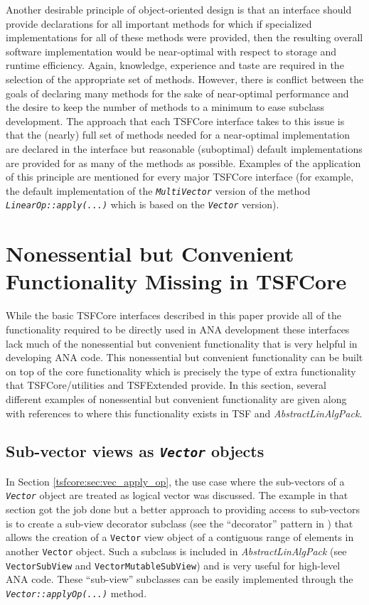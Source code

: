 Another desirable principle of object-oriented design is that an
interface should provide declarations for all important methods for
which if specialized implementations for all of these methods were
provided, then the resulting overall software implementation would be
near-optimal with respect to storage and runtime efficiency.  Again,
knowledge, experience and taste are required in the selection of the
appropriate set of methods.  However, there is conflict between the
goals of declaring many methods for the sake of near-optimal
performance and the desire to keep the number of methods to a minimum
to ease subclass development.  The approach that each TSFCore
interface takes to this issue is that the (nearly) full set of methods
needed for a near-optimal implementation are declared in the interface
but reasonable (suboptimal) default implementations are provided for
as many of the methods as possible.  Examples of the application of
this principle are mentioned for every major TSFCore interface (for
example, the default implementation of the
{}\texttt{\textit{Multi\-Vector}} version of the method
{}\texttt{\textit{LinearOp\-::apply(\-...)}} which is based on the
{}\texttt{\textit{Vector}} version).

%
\section{Nonessential but Convenient Functionality Missing in TSFCore}
\label{tsfcore:sec:convenience_functionality}
%

While the basic TSFCore interfaces described in this paper provide all
of the functionality required to be directly used in ANA development
these interfaces lack much of the nonessential but convenient
functionality that is very helpful in developing ANA code.  This
nonessential but convenient functionality can be built on top of the
core functionality which is precisely the type of extra functionality
that TSFCore/utilities and TSFExtended provide.  In this section,
several different examples of nonessential but convenient
functionality are given along with references to where this
functionality exists in TSF and {}\textit{AbstractLinAlgPack}.

%
\subsection{Sub-vector views as {}\texttt{\textit{Vector}} objects}
%

In Section {}\ref{tsfcore:sec:vec_apply_op}, the use case where the
sub-vectors of a {}\texttt{\textit{Vector}} object are treated as
logical vector was discussed.  The example in that section got the job
done but a better approach to providing access to sub-vectors is to
create a sub-view decorator subclass (see the ``decorator'' pattern in
{}\cite{ref:gama_et_al_1995}) that allows the creation of a
{}\texttt{Vector} view object of a contiguous range of elements in
another {}\texttt{Vector} object.  Such a subclass is included in
{}\textit{AbstractLinAlgPack} (see {}\texttt{VectorSubView} and
{}\texttt{Vector\-Mutable\-Sub\-View}) and is very useful for
high-level ANA code.  These ``sub-view'' subclasses can be easily
implemented through the {}\texttt{\textit{Vector\-::applyOp(\-...)}}
method.

